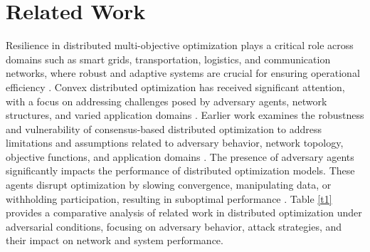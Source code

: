 \documentclass[journal]{IEEEtran}
\begin{document}
\section{Related Work} \label{sec2} 
Resilience in distributed multi-objective optimization plays a critical role across domains such as smart grids, transportation, logistics, and communication networks, where robust and adaptive systems are crucial for ensuring operational efficiency \cite{yazdani2023techno, qiao2023multi}. Convex distributed optimization has received significant attention, with a focus on addressing challenges posed by adversary agents, network structures, and varied application domains \cite{yang2019survey, fanitabasi2018review, patari2021distributed}. Earlier work examines the robustness and vulnerability of consensus-based distributed optimization to address limitations and assumptions related to adversary behavior, network topology, objective functions, and application domains \cite{fanitabasi2018review, fu2021resilient, zhang2023accelerated}. The presence of adversary agents significantly impacts the performance of distributed optimization models. These agents disrupt optimization by slowing convergence, manipulating data, or withholding participation, resulting in suboptimal performance \cite{gupta2020fault, gonzalez2018multi}. Table \ref{t1} provides a comparative analysis of related work in distributed optimization under adversarial conditions, focusing on adversary behavior, attack strategies, and their impact on network and system performance.
\end{document}
